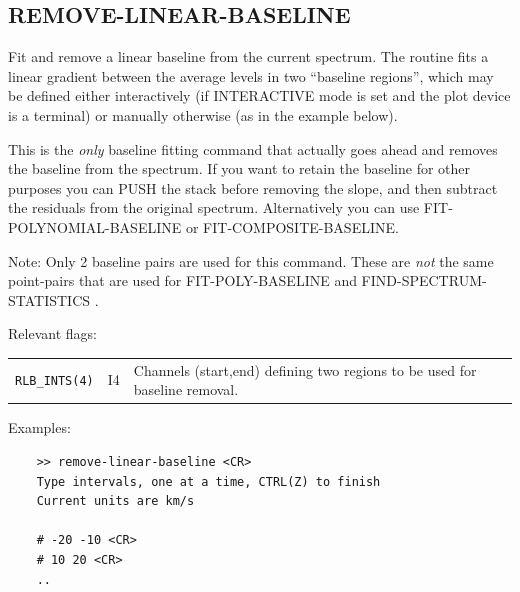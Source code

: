 \documentclass[11pt,twoside]{report}
\begin{document}
\subsection{REMOVE-LINEAR-BASELINE} 

Fit and remove a linear baseline from the current spectrum. The routine
fits a linear gradient between the average levels in two ``baseline regions'',
which may be defined either interactively (if INTERACTIVE mode is set and the
plot device is a terminal) or manually otherwise (as in the example below).

This is the {\em only} baseline fitting command that actually goes ahead
and removes the baseline from the spectrum. If you want to retain the
baseline for other purposes you can PUSH the stack before removing the
slope, and then subtract the residuals from the original spectrum. 
Alternatively you can use FIT-POLYNOMIAL-BASELINE or FIT-COMPOSITE-BASELINE.
 

Note: Only 2 baseline pairs are used for this command. These are {\em not} the
same point-pairs that are used for FIT-POLY-BASELINE \etc and
FIND-SPECTRUM-STATISTICS \etc.

Relevant flags:\\
\begin{tabular}{lll}
  \verb+RLB_INTS(4)+ & I4 & \parbox[t]{4in}
                            {Channels (start,end) defining two regions
                             to be used for baseline removal.}
\end{tabular}

Examples:
\begin{verbatim}
    >> remove-linear-baseline <CR>
    Type intervals, one at a time, CTRL(Z) to finish
    Current units are km/s  

    # -20 -10 <CR>
    # 10 20 <CR>
    ..
\end{verbatim}
\end{document}
